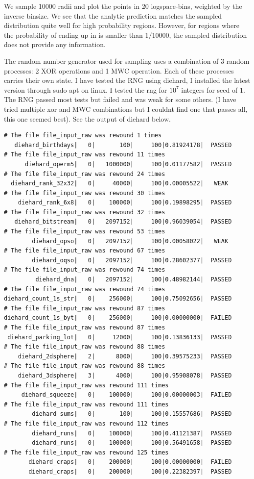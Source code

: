 \documentclass{article}
\begin{document}
We sample 10000 radii and plot the points in 20 logspace-bins, weighted by the inverse binsize. 
We see that the analytic prediction matches the sampled distribution quite well for high probability regions.
However, for regions where the probability of ending up in is smaller than $1/10000$, the sampled distribution
does not provide any information.

The random number generator used for sampling uses a combination of 3 random processes:
2 XOR operations and 1 MWC operation. Each of these processes carries their own state.
I have tested the RNG using diehard, I installed the latest version through sudo apt on linux.
I tested the rng for $10^7$ integers for seed of 1.
The RNG passed most tests but failed and was weak for some others. 
(I have tried multiple xor and MWC combinations but I couldnt find one that passes all, this one seemed best).
See the output of diehard below.

\begin{verbatim}
# The file file_input_raw was rewound 1 times
   diehard_birthdays|   0|       100|     100|0.81924178|  PASSED  
# The file file_input_raw was rewound 11 times
      diehard_operm5|   0|   1000000|     100|0.01177582|  PASSED  
# The file file_input_raw was rewound 24 times
  diehard_rank_32x32|   0|     40000|     100|0.00005522|   WEAK   
# The file file_input_raw was rewound 30 times
    diehard_rank_6x8|   0|    100000|     100|0.19898295|  PASSED  
# The file file_input_raw was rewound 32 times
   diehard_bitstream|   0|   2097152|     100|0.96039054|  PASSED  
# The file file_input_raw was rewound 53 times
        diehard_opso|   0|   2097152|     100|0.00058022|   WEAK   
# The file file_input_raw was rewound 67 times
        diehard_oqso|   0|   2097152|     100|0.28602377|  PASSED  
# The file file_input_raw was rewound 74 times
         diehard_dna|   0|   2097152|     100|0.48982144|  PASSED  
# The file file_input_raw was rewound 74 times
diehard_count_1s_str|   0|    256000|     100|0.75092656|  PASSED  
# The file file_input_raw was rewound 87 times
diehard_count_1s_byt|   0|    256000|     100|0.00000000|  FAILED  
# The file file_input_raw was rewound 87 times
 diehard_parking_lot|   0|     12000|     100|0.13836133|  PASSED  
# The file file_input_raw was rewound 88 times
    diehard_2dsphere|   2|      8000|     100|0.39575233|  PASSED  
# The file file_input_raw was rewound 88 times
    diehard_3dsphere|   3|      4000|     100|0.95908078|  PASSED  
# The file file_input_raw was rewound 111 times
     diehard_squeeze|   0|    100000|     100|0.00000003|  FAILED  
# The file file_input_raw was rewound 111 times
        diehard_sums|   0|       100|     100|0.15557686|  PASSED  
# The file file_input_raw was rewound 112 times
        diehard_runs|   0|    100000|     100|0.41121387|  PASSED  
        diehard_runs|   0|    100000|     100|0.56491658|  PASSED  
# The file file_input_raw was rewound 125 times
       diehard_craps|   0|    200000|     100|0.00000000|  FAILED  
       diehard_craps|   0|    200000|     100|0.22382397|  PASSED 
\end{verbatim}
\end{document}
